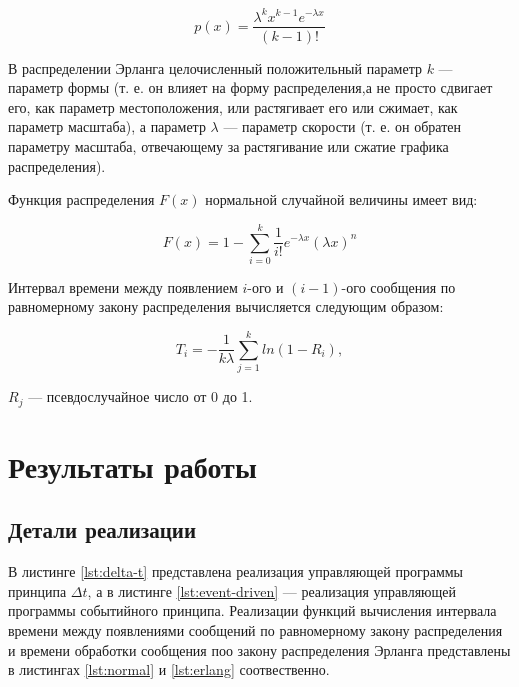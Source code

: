 \begin{equation}
p(x) = \frac{\lambda^k x^{k-1} e^{-\lambda x} } {(k-1)!}
\end{equation}

В распределении Эрланга целочисленный положительный параметр $k$ 	--- параметр формы (т. е. он влияет на форму распределения,а не просто сдвигает его, как параметр местоположения, или растягивает его или сжимает, как параметр масштаба), а параметр $\lambda$ --- параметр скорости (т. е. он обратен параметру масштаба, отвечающему за растягивание или сжатие графика распределения). 

Функция распределения $F(x)$ нормальной случайной величины имеет вид:

\begin{equation*}
F(x) = 1 - \sum_{i=0}^k  \frac{1}{i!} e^{-\lambda x} (\lambda x)^n
\end{equation*}

Интервал времени между появлением $i$-ого и $(i - 1)$-ого сообщения по равномерному закону распределения вычисляется следующим образом:

\begin{equation}
	T_{i} = - \frac{1}{k \lambda} \sum_{j = 1}^{k} ln (1 - R_i),
\end{equation}

 $R_j$ --- псевдослучайное число от 0 до 1.

\section*{Результаты работы}

\subsection*{Детали реализации}

В листинге \ref{lst:delta-t} представлена реализация управляющей программы принципа $\Delta t$, а в листинге \ref{lst:event-driven} --- реализация управляющей программы событийного принципа.
Реализации функций вычисления интервала времени между появлениями сообщений по равномерному закону распределения и времени обработки сообщения поо закону распределения Эрланга представлены в листингах \ref{lst:normal} и \ref{lst:erlang} соотвественно.
\clearpage

